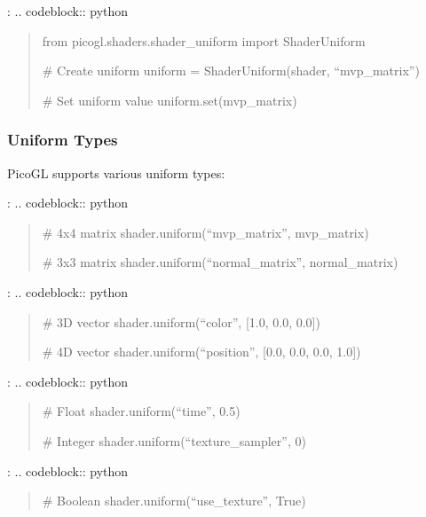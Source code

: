 \documentclass[a4paper,10pt,english,openany,oneside]{sphinxmanual}
\begin{document}
\sphinxAtStartPar
{}:
.. code\sphinxhyphen{}block:: python
\begin{quote}

\sphinxAtStartPar
from picogl.shaders.shader\_uniform import ShaderUniform

\sphinxAtStartPar
\# Create uniform
uniform = ShaderUniform(shader, “mvp\_matrix”)

\sphinxAtStartPar
\# Set uniform value
uniform.set(mvp\_matrix)
\end{quote}


\subsubsection{Uniform Types}
\label{\detokenize{api/shaders:uniform-types}}
\sphinxAtStartPar
PicoGL supports various uniform types:

\sphinxAtStartPar
{}:
.. code\sphinxhyphen{}block:: python
\begin{quote}

\sphinxAtStartPar
\# 4x4 matrix
shader.uniform(“mvp\_matrix”, mvp\_matrix)

\sphinxAtStartPar
\# 3x3 matrix
shader.uniform(“normal\_matrix”, normal\_matrix)
\end{quote}

\sphinxAtStartPar
{}:
.. code\sphinxhyphen{}block:: python
\begin{quote}

\sphinxAtStartPar
\# 3D vector
shader.uniform(“color”, {[}1.0, 0.0, 0.0{]})

\sphinxAtStartPar
\# 4D vector
shader.uniform(“position”, {[}0.0, 0.0, 0.0, 1.0{]})
\end{quote}

\sphinxAtStartPar
{}:
.. code\sphinxhyphen{}block:: python
\begin{quote}

\sphinxAtStartPar
\# Float
shader.uniform(“time”, 0.5)

\sphinxAtStartPar
\# Integer
shader.uniform(“texture\_sampler”, 0)
\end{quote}

\sphinxAtStartPar
{}:
.. code\sphinxhyphen{}block:: python
\begin{quote}

\sphinxAtStartPar
\# Boolean
shader.uniform(“use\_texture”, True)
\end{quote}
\end{document}
